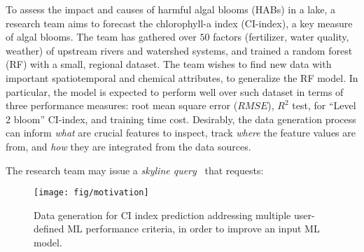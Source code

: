 \begin{example}
\label{exa-motivation}
To assess the impact and causes of harmful algal blooms (HABs) in a lake, a research team aims to forecast the chlorophyll-a index (CI-index), a key measure of algal blooms. 
The team has gathered over $50$ factors
(\eg fertilizer, water quality, weather)
of upstream rivers and watershed 
systems, %
and trained 
a random forest (RF) %
with a small, regional dataset.
The team wishes to find new 
data with important spatiotemporal and chemical 
attributes, to generalize the RF model. In particular,  
the model is expected to perform well 
over such dataset  
in terms of three performance measures: 
root mean square error ($RMSE$),  $R^2$ test, for ``Level 2 bloom'' CI-index, 
and training time cost. 
Desirably, 
the data generation process 
can inform {\em what} are crucial features to inspect,  
track {\em where} 
the feature values are from, and {\em how}  
they are integrated from the data sources.

\vspace{.5ex}
The research team may issue
a {\em skyline query}~\cite{chomicki2013skyline} that requests: 

\begin{figure}[tb!]
\vspace{-1ex}
\centerline{\texttt{[image: fig/motivation]}}
\centering
\vspace{-1ex}
\caption{
Data generation for CI index prediction addressing  
multiple user-defined ML performance criteria, in order to improve an input ML model.  %
}
\label{fig:motivation}
\vspace{-2ex}
\end{figure}



\end{example}
